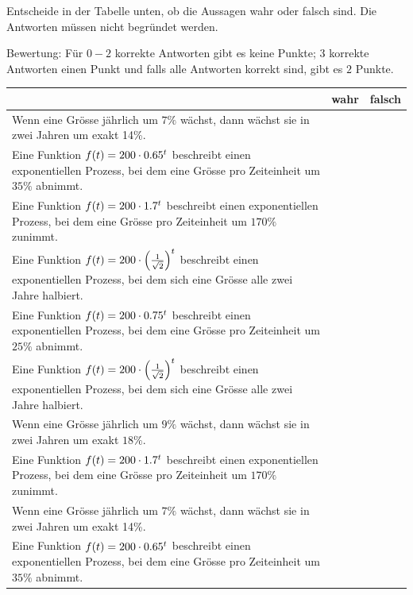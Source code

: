 \documentclass[11pt]{exam}
\begin{document}
\begin{questions}
\question[2]
Entscheide in der Tabelle unten, ob die Aussagen wahr oder falsch sind. Die Antworten müssen nicht begründet werden.\newline
\begin{small}
    Bewertung: Für $0-2$ korrekte Antworten gibt es keine Punkte; $3$ korrekte Antworten einen Punkt und falls alle Antworten korrekt sind, gibt es $2$ Punkte.
\end{small}
\begingroup
\renewcommand{\arraystretch}{1.5}
\begin{table}[h]
    \centering
    \begin{tabular}{|p{12cm}|c|c|}\hline
         & wahr & falsch \\\hline
        Wenn eine Grösse jährlich um $7\%$ wächst, dann wächst sie in zwei Jahren um exakt 14\%. & & \\\hline
        Eine Funktion $f(t)=200\cdot0.65^t$ beschreibt einen exponentiellen Prozess, bei dem eine Grösse pro Zeiteinheit um $35\%$ abnimmt. & & \\\hline
        Eine Funktion $f(t)=200\cdot1.7^t$ beschreibt einen exponentiellen Prozess, bei dem eine Grösse pro Zeiteinheit um $170\%$ zunimmt. & & \\\hline
        Eine Funktion $f(t)=200\cdot\left(\frac{1}{\sqrt{2}}\right)^t$ beschreibt einen exponentiellen Prozess, bei dem sich eine Grösse alle zwei Jahre halbiert. & & \\\hline
        Eine Funktion $f(t)=200\cdot0.75^t$ beschreibt einen exponentiellen Prozess, bei dem eine Grösse pro Zeiteinheit um $25\%$ abnimmt. & & \\\hline
        Eine Funktion $f(t)=200\cdot\left(\frac{1}{\sqrt{2}}\right)^t$ beschreibt einen exponentiellen Prozess, bei dem sich eine Grösse alle zwei Jahre halbiert. & & \\\hline
        Wenn eine Grösse jährlich um $9\%$ wächst, dann wächst sie in zwei Jahren um exakt $18\%$. & & \\\hline
        Eine Funktion $f(t)=200\cdot1.7^t$ beschreibt einen exponentiellen Prozess, bei dem eine Grösse pro Zeiteinheit um $170\%$ zunimmt. & & \\\hline
        Wenn eine Grösse jährlich um $7\%$ wächst, dann wächst sie in zwei Jahren um exakt 14\%. & & \\\hline
        Eine Funktion $f(t)=200\cdot0.65^t$ beschreibt einen exponentiellen Prozess, bei dem eine Grösse pro Zeiteinheit um $35\%$ abnimmt. & & \\\hline

\end{tabular}
\end{table}
\end{questions}
\end{document}
